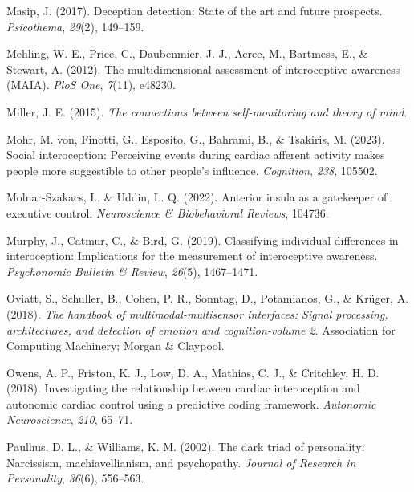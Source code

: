 \documentclass[
  man,mask,floatsintext]{apa6}
\newlength{\cslhangindent}
\newlength{\cslentryspacingunit} %
\newenvironment{CSLReferences}[2] %
 {%
  \setlength{\parindent}{0pt}
  \ifodd #1
  \let\oldpar\par
  \def\par{\hangindent=\cslhangindent\oldpar}
  \fi
  \setlength{\parskip}{#2\cslentryspacingunit}
 }%
 {}
\begin{document}
\begin{CSLReferences}{1}{0}
\leavevmode{}%
Masip, J. (2017). Deception detection: State of the art and future prospects. \emph{Psicothema}, \emph{29}(2), 149--159.

\leavevmode{}%
Mehling, W. E., Price, C., Daubenmier, J. J., Acree, M., Bartmess, E., \& Stewart, A. (2012). The multidimensional assessment of interoceptive awareness (MAIA). \emph{PloS One}, \emph{7}(11), e48230.

\leavevmode{}%
Miller, J. E. (2015). \emph{The connections between self-monitoring and theory of mind}.

\leavevmode{}%
Mohr, M. von, Finotti, G., Esposito, G., Bahrami, B., \& Tsakiris, M. (2023). Social interoception: Perceiving events during cardiac afferent activity makes people more suggestible to other people's influence. \emph{Cognition}, \emph{238}, 105502.

\leavevmode{}%
Molnar-Szakacs, I., \& Uddin, L. Q. (2022). Anterior insula as a gatekeeper of executive control. \emph{Neuroscience \& Biobehavioral Reviews}, 104736.

\leavevmode{}%
Murphy, J., Catmur, C., \& Bird, G. (2019). Classifying individual differences in interoception: Implications for the measurement of interoceptive awareness. \emph{Psychonomic Bulletin \& Review}, \emph{26}(5), 1467--1471.

\leavevmode{}%
Oviatt, S., Schuller, B., Cohen, P. R., Sonntag, D., Potamianos, G., \& Krüger, A. (2018). \emph{The handbook of multimodal-multisensor interfaces: Signal processing, architectures, and detection of emotion and cognition-volume 2}. Association for Computing Machinery; Morgan \& Claypool.

\leavevmode{}%
Owens, A. P., Friston, K. J., Low, D. A., Mathias, C. J., \& Critchley, H. D. (2018). Investigating the relationship between cardiac interoception and autonomic cardiac control using a predictive coding framework. \emph{Autonomic Neuroscience}, \emph{210}, 65--71.

\leavevmode{}%
Paulhus, D. L., \& Williams, K. M. (2002). The dark triad of personality: Narcissism, machiavellianism, and psychopathy. \emph{Journal of Research in Personality}, \emph{36}(6), 556--563.


\end{CSLReferences}
\end{document}

